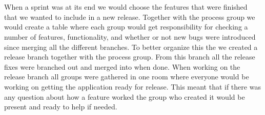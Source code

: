 \\
\\
When a sprint was at its end we would choose the features that were finished that we wanted to include in a new release.
Together with the process group we would create a table where each group would get responsibility for checking a number of features, functionality, and whether or not new bugs were introduced since merging all the different branches.
To better organize this the we created a release branch together with the process group.
From this branch all the release fixes were branched out and merged into when done.
When working on the release branch all groups were gathered in one room where everyone would be working on getting the application ready for release.
This meant that if there was any question about how a feature worked the group who created it would be present and ready to help if needed.
